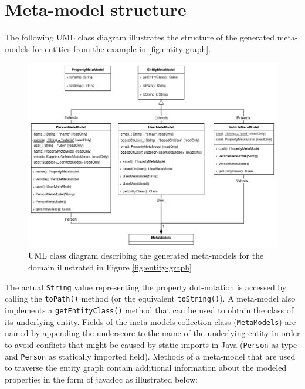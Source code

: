 \section{Meta-model structure}

The following UML class diagram illustrates the structure of the generated meta-models for entities from the example in \ref{fig:entity-graph}.

\begin{figure}[H]\centering
    \includegraphics[scale=0.55]{images/meta-model-uml.drawio.png}
    \caption[UML class diagram for generated meta-models]{UML class diagram describing the generated meta-models for the domain illustrated in Figure \ref{fig:entity-graph}}\label{fig:meta-model_uml}
\end{figure}

The actual \texttt{String} value representing the property dot-notation is accessed by calling the \texttt{toPath()} method (or the equivalent \texttt{toString()}). 
A meta-model also implements a \texttt{getEntityClass()} method that can be used to obtain the class of its underlying entity.
Fields of the meta-models collection class (\texttt{MetaModels}) are named by appending the underscore to the name of the underlying entity in order to avoid conflicts that might be caused by static imports in Java (\texttt{Person} as type and \texttt{Person} as statically imported field).
Methods of a meta-model that are used to traverse the entity graph contain additional information about the modeled properties in the form of javadoc as illustrated below:

\n

